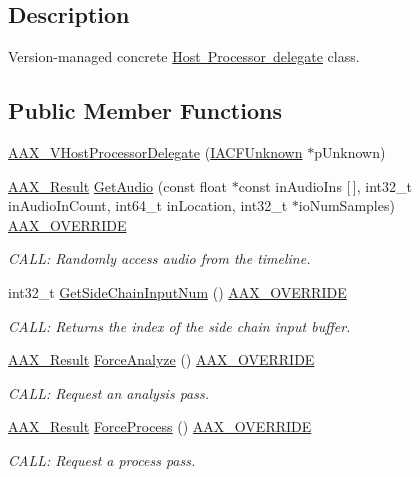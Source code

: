 \subsection{Description}
Version-\/managed concrete \mbox{\hyperlink{a01837}{Host Processor delegate}} class. \subsection*{Public Member Functions}
\begin{DoxyCompactItemize}
\item 
\mbox{\hyperlink{a01921_ab50f9b08bc0d0ab6696ad3081aa790d8}{A\+A\+X\+\_\+\+V\+Host\+Processor\+Delegate}} (\mbox{\hyperlink{a01409}{I\+A\+C\+F\+Unknown}} $\ast$p\+Unknown)
\item 
\mbox{\hyperlink{a00392_a4d8f69a697df7f70c3a8e9b8ee130d2f}{A\+A\+X\+\_\+\+Result}} \mbox{\hyperlink{a01921_a030e6742a3aa468a50faccb77329a557}{Get\+Audio}} (const float $\ast$const in\+Audio\+Ins \mbox{[}$\,$\mbox{]}, int32\+\_\+t in\+Audio\+In\+Count, int64\+\_\+t in\+Location, int32\+\_\+t $\ast$io\+Num\+Samples) \mbox{\hyperlink{a00392_ac2f24a5172689ae684344abdcce55463}{A\+A\+X\+\_\+\+O\+V\+E\+R\+R\+I\+DE}}
\begin{DoxyCompactList}\small\item\em C\+A\+LL\+: Randomly access audio from the timeline. \end{DoxyCompactList}\item 
int32\+\_\+t \mbox{\hyperlink{a01921_a31d793b6a43eb642446f6149621bcdf9}{Get\+Side\+Chain\+Input\+Num}} () \mbox{\hyperlink{a00392_ac2f24a5172689ae684344abdcce55463}{A\+A\+X\+\_\+\+O\+V\+E\+R\+R\+I\+DE}}
\begin{DoxyCompactList}\small\item\em C\+A\+LL\+: Returns the index of the side chain input buffer. \end{DoxyCompactList}\item 
\mbox{\hyperlink{a00392_a4d8f69a697df7f70c3a8e9b8ee130d2f}{A\+A\+X\+\_\+\+Result}} \mbox{\hyperlink{a01921_aeb3eb18f1c9562a31173d600dad9b251}{Force\+Analyze}} () \mbox{\hyperlink{a00392_ac2f24a5172689ae684344abdcce55463}{A\+A\+X\+\_\+\+O\+V\+E\+R\+R\+I\+DE}}
\begin{DoxyCompactList}\small\item\em C\+A\+LL\+: Request an analysis pass. \end{DoxyCompactList}\item 
\mbox{\hyperlink{a00392_a4d8f69a697df7f70c3a8e9b8ee130d2f}{A\+A\+X\+\_\+\+Result}} \mbox{\hyperlink{a01921_a5e72699c0dafb133a2dfabf63ba8f56a}{Force\+Process}} () \mbox{\hyperlink{a00392_ac2f24a5172689ae684344abdcce55463}{A\+A\+X\+\_\+\+O\+V\+E\+R\+R\+I\+DE}}
\begin{DoxyCompactList}\small\item\em C\+A\+LL\+: Request a process pass. \end{DoxyCompactList}\end{DoxyCompactItemize}


